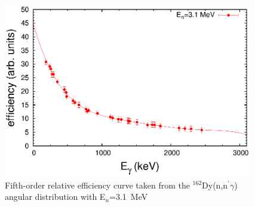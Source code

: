 \begin{figure}[ht]
\begin{center}
\includegraphics[width=0.97\textwidth]{310_polyfit_color.eps}
\caption{Fifth-order relative efficiency curve taken from the $^{162}$Dy(n,n$^{\prime}\gamma$) angular distribution with E$_n$=3.1~MeV
\label{fig:polyfit}}
\end{center}
\end{figure}

